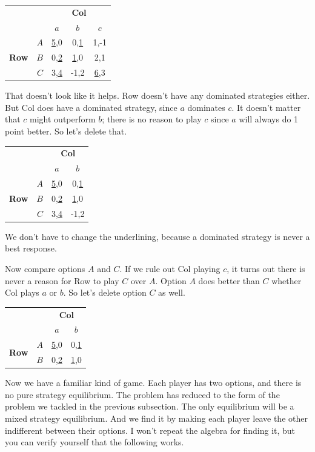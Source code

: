 \documentclass[openany]{book}
\begin{document}
\begin{center}
\begin{tabular}{l r | c c c}
& & \multicolumn{3}{c}{\textbf{Col}} \\
& & $a$ & $b$ & $c$ \\ \hline
\multirow{3}{*}{\textbf{Row}}
& $A$ & \underline{5},0 & 0,\underline{1} & 1,-1 \\
& $B$ & 0,\underline{2} & \underline{1},0 & 2,1\\
& $C$ & 3,\underline{4} & -1,2 & \underline{6},3
\end{tabular}
\end{center}
That doesn't look like it helps. Row doesn't have any dominated strategies either. But Col does have a dominated strategy, since $a$ dominates $c$. It doesn't matter that $c$ might outperform $b$; there is no reason to play $c$ since $a$ will always do 1 point better. So let's delete that.

\begin{center}
\begin{tabular}{l r | c c}
& & \multicolumn{2}{c}{\textbf{Col}} \\
& & $a$ & $b$  \\ \hline
\multirow{3}{*}{\textbf{Row}}
& $A$ & \underline{5},0 & 0,\underline{1} \\
& $B$ & 0,\underline{2} & \underline{1},0 \\
& $C$ & 3,\underline{4} & -1,2 
\end{tabular}
\end{center}
We don't have to change the underlining, because a dominated strategy is never a best response. 

Now compare options $A$ and $C$. If we rule out Col playing $c$, it turns out there is never a reason for Row to play $C$ over $A$. Option $A$ does better than $C$ whether Col plays $a$ or $b$. So let's delete option $C$ as well.

\begin{center}
\begin{tabular}{l r | c c}
& & \multicolumn{2}{c}{\textbf{Col}} \\
& & $a$ & $b$ \\ \hline
\multirow{2}{*}{\textbf{Row}}
& $A$ & \underline{5},0 & 0,\underline{1} \\
& $B$ & 0,\underline{2} & \underline{1},0 \\
\end{tabular}
\end{center}
Now we have a familiar kind of game. Each player has two options, and there is no pure strategy equilibrium. The problem has reduced to the form of the problem we tackled in the previous subsection. The only equilibrium will be a mixed strategy equilibrium. And we find it by making each player leave the other indifferent between their options. I won't repeat the algebra for finding it, but you can verify yourself that the following works.
\end{document}

